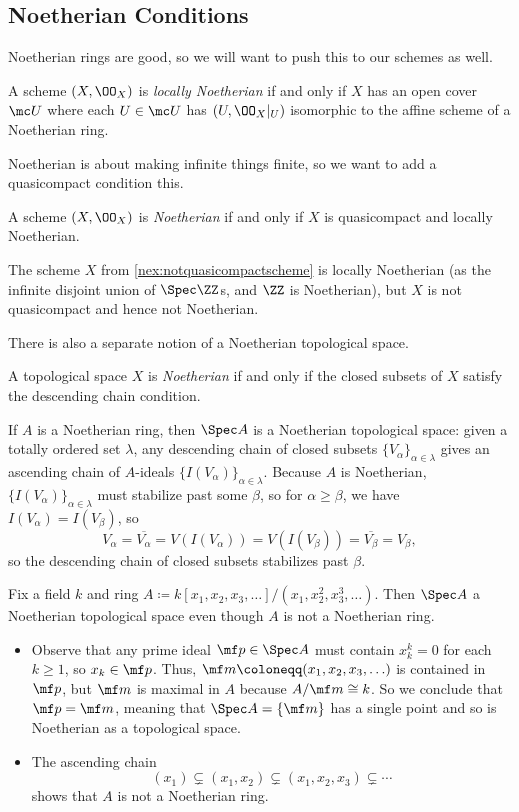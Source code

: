 \documentclass[../notes.tex]{subfiles}
\begin{document}
\subsection{Noetherian Conditions}
Noetherian rings are good, so we will want to push this to our schemes as well.
\begin{definition}
	A scheme $(X,\OO_X)$ is \textit{locally Noetherian} if and only if $X$ has an open cover $\mc U$ where each $U\in\mc U$ has $(U,\OO_X|_U)$ isomorphic to the affine scheme of a Noetherian ring.
\end{definition}
Noetherian is about making infinite things finite, so we want to add a quasicompact condition this.
\begin{definition}[Noetherian]
	A scheme $(X,\OO_X)$ is \textit{Noetherian} if and only if $X$ is quasicompact and locally Noetherian.
\end{definition}
\begin{example}
	The scheme $X$ from \autoref{nex:notquasicompactscheme} is locally Noetherian (as the infinite disjoint union of $\Spec\ZZ$s, and $\ZZ$ is Noetherian), but $X$ is not quasicompact and hence not Noetherian.
\end{example}
There is also a separate notion of a Noetherian topological space.
\begin{definition}[Noetherian]
	A topological space $X$ is \textit{Noetherian} if and only if the closed subsets of $X$ satisfy the descending chain condition.
\end{definition}
\begin{example} \label{ex:noetherianringisnoetherian}
	If $A$ is a Noetherian ring, then $\Spec A$ is a Noetherian topological space: given a totally ordered set $\lambda$, any descending chain of closed subsets $\{V_\alpha\}_{\alpha\in\lambda}$ gives an ascending chain of $A$-ideals $\{I(V_\alpha)\}_{\alpha\in\lambda}$. Because $A$ is Noetherian, $\{I(V_\alpha)\}_{\alpha\in\lambda}$ must stabilize past some $\beta$, so for $\alpha\ge\beta$, we have $I(V_\alpha)=I(V_\beta)$, so
	\[V_\alpha=\overline{V_\alpha}=V(I(V_\alpha))=V(I(V_\beta))=\overline{V_\beta}=V_\beta,\]
	so the descending chain of closed subsets stabilizes past $\beta$.
\end{example}
\begin{nex}
	Fix a field $k$ and ring $A\coloneqq k[x_1,x_2,x_3,\ldots]/\left(x_1,x_2^2,x_3^3,\ldots\right)$. Then $\Spec A$ a Noetherian topological space even though $A$ is not a Noetherian ring.
	\begin{itemize}
		\item Observe that any prime ideal $\mf p\in\Spec A$ must contain $x_k^k=0$ for each $k\ge1$, so $x_k\in\mf p$. Thus, $\mf m\coloneqq(x_1,x_2,x_3,\ldots)$ is contained in $\mf p$, but $\mf m$ is maximal in $A$ because $A/\mf m\cong k$. So we conclude that $\mf p=\mf m$, meaning that $\Spec A=\{\mf m\}$ has a single point and so is Noetherian as a topological space.
		\item The ascending chain
		\[(x_1)\subsetneq(x_1,x_2)\subsetneq(x_1,x_2,x_3)\subsetneq\cdots\]
		shows that $A$ is not a Noetherian ring.
	\end{itemize}
\end{nex}
\end{document}
